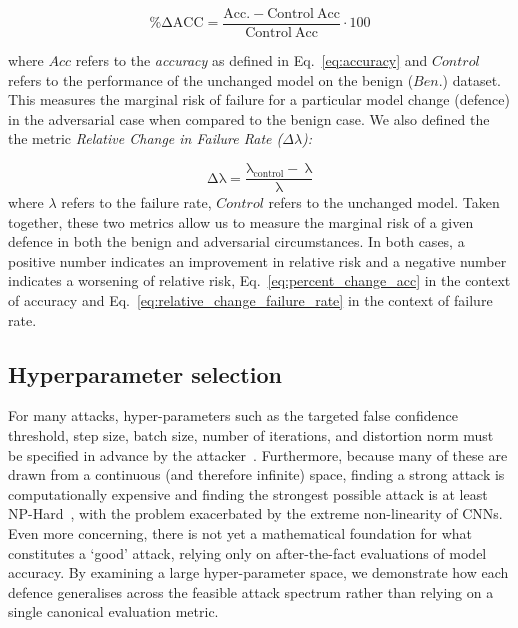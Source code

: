 \begin{equation}
    \label{eq:percent_change_acc}
    \mathrm{\%\Delta ACC =
        \frac{Acc.-Control~Acc}{Control~Acc}} \cdot 100
\end{equation}

where $Acc$ refers to the \textit{accuracy} as defined in Eq.~\ref{eq:accuracy} and $Control$ refers to the performance of the unchanged model on the benign ($Ben.$) dataset.
This measures the marginal risk of failure for a particular model change (defence) in the adversarial case when compared to the benign case.
We also defined the the metric \textit{Relative Change in Failure Rate ($ \Delta \lambda$):}

\begin{equation}
\label{eq:relative_change_failure_rate}
\mathrm{\Delta \lambda} =
    \frac{\mathrm{\lambda_{control}-~\lambda}}{\mathrm{\lambda}}
\end{equation}
where $\lambda$ refers to the failure rate, $Control$ refers to the unchanged model.
Taken together, these two metrics allow us to measure the marginal risk of a given defence in both the benign and adversarial circumstances.
In both cases, a positive number indicates an improvement in relative risk and a negative number indicates a worsening of relative risk, Eq.~\ref{eq:percent_change_acc} in the context of accuracy and Eq.~\ref{eq:relative_change_failure_rate} in the context of failure rate.

\subsection{Hyperparameter selection}

For many attacks, hyper-parameters such as the targeted false confidence threshold, step size, batch size, number of iterations, and distortion norm must be specified in advance by the attacker~\cite{carlini_towards_2017}.
Furthermore, because many of these are drawn from a continuous (and therefore infinite) space, finding a strong attack is computationally expensive and finding the strongest possible attack is at least NP-Hard~\cite{carlini_towards_2017}, with the problem exacerbated by the extreme non-linearity of CNNs.
Even more concerning, there is not yet a mathematical foundation for what constitutes a `good' attack, relying only on after-the-fact evaluations of model accuracy.
By examining a large hyper-parameter space, we demonstrate how each defence generalises across the feasible attack spectrum rather than relying on a single canonical evaluation metric.


